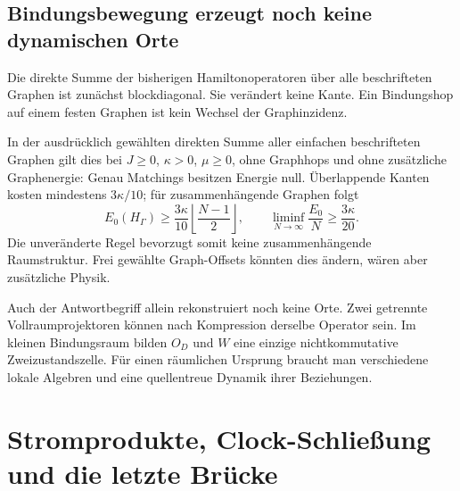 \section{Bindungsbewegung erzeugt noch keine dynamischen Orte}
Die direkte Summe der bisherigen Hamiltonoperatoren über alle beschrifteten Graphen ist zunächst blockdiagonal. Sie verändert keine Kante. Ein Bindungshop auf einem festen Graphen ist kein Wechsel der Graphinzidenz. 

In der ausdrücklich gewählten direkten Summe aller einfachen beschrifteten Graphen gilt dies bei $J\ge0$, $\kappa>0$, $\mu\ge0$, ohne Graphhops und ohne zusätzliche Graphenergie: Genau Matchings besitzen Energie null. Überlappende Kanten kosten mindestens $3\kappa/10$; für zusammenhängende Graphen folgt
\[
 E_0(H_\Gamma)\ge\frac{3\kappa}{10}\left\lfloor\frac{N-1}{2}\right\rfloor,
 \qquad\liminf_{N\to\infty}\frac{E_0}{N}\ge\frac{3\kappa}{20}.
\]
Die unveränderte Regel bevorzugt somit keine zusammenhängende Raumstruktur. Frei gewählte Graph-Offsets könnten dies ändern, wären aber zusätzliche Physik. 

Auch der Antwortbegriff allein rekonstruiert noch keine Orte. Zwei getrennte Vollraumprojektoren können nach Kompression derselbe Operator sein. Im kleinen Bindungsraum bilden $O_D$ und $W$ eine einzige nichtkommutative Zweizustandszelle. Für einen räumlichen Ursprung braucht man verschiedene lokale Algebren und eine quellentreue Dynamik ihrer Beziehungen. 

\chapter{Stromprodukte, Clock-Schließung und die letzte Brücke}
